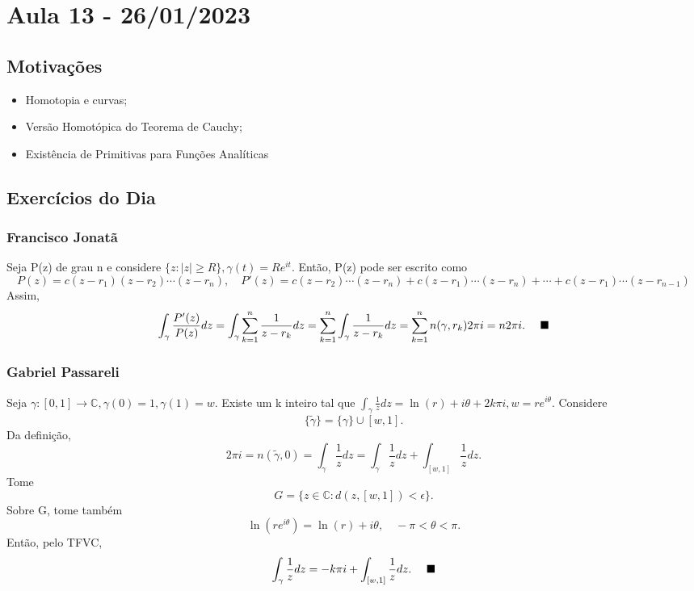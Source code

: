 \documentclass[ComplexAnalysis/complex.tex]{subfiles}
\begin{document}
\section{Aula 13 - 26/01/2023}
\subsection{Motivações}
\begin{itemize}
	\item Homotopia e curvas;
	\item Versão Homotópica do Teorema de Cauchy;
	\item Existência de Primitivas para Funções Analíticas
\end{itemize}

\subsection{Exercícios do Dia}
\subsubsection{Francisco Jonatã}
Seja P(z) de grau n e considere $\{z:|z|\geq R\}, \gamma(t) = Re^{it}.$ Então, P(z) pode ser escrito como
$$
	P(z) = c(z-r_{1})(z-r_2)\cdots(z-r_{n}),\quad P'(z) = c(z-r_2)\cdots(z-r_{n}) + c(z-r_{1})\cdots(z-r_{n}) + \cdots + c(z-r_1)\cdots(z-r_{n-1})
$$
Assim,
$$
	\int_{\gamma}^{}\frac{P'(z)}{P(z)}dz = \int_{\gamma}^{}\sum\limits_{k=1}^{n}\frac{1}{z-r_{k}}dz = \sum\limits_{k=1}^{n}\int_{\gamma}^{}\frac{1}{z-r_{k}}dz = \sum\limits_{k=1}^{n}n(\gamma, r_{k})2\pi i = n2\pi i.\quad\text{ $\blacksquare$}
$$

\subsubsection{Gabriel Passareli}
Seja $\gamma:[0, 1]\rightarrow \mathbb{C}, \gamma(0) = 1, \gamma(1) = w.$ Existe um k inteiro tal que $\int_{\gamma}^{}\frac{1}{z}dz = \ln{(r)} + i\theta + 2k\pi i, w=re^{i\theta}.$
Considere
$$
	\{\tilde\gamma\} = \{\gamma\}\cup{[w, 1]}.
$$
Da definição,
$$
	2\pi i = n(\tilde \gamma, 0) = \int_{\gamma}^{}\frac{1}{z}dz = \int_{\gamma}^{}\frac{1}{z}dz + \int_{[w, 1]}^{}\frac{1}{z}dz.
$$
Tome
$$
	G = \{z\in \mathbb{C}: d(z, [w, 1]) < \epsilon\}.
$$
Sobre G, tome também
$$
	\ln{(re^{i \theta})} = \ln{(r)} + i \theta, \quad -\pi < \theta < \pi.
$$
Então, pelo TFVC,
$$
	\int_{\gamma}^{}\frac{1}{z}dz = -k\pi i + \int_{[w, 1]}^{}\frac{1}{z}dz. \quad\text{ $\blacksquare$}
$$
\end{document}
